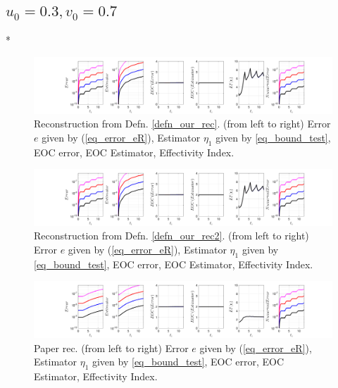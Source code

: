 \documentclass[12pt,a4paper]{article}
\numberwithin{equation}{section}
\theoremstyle{definition}
\begin{document}
\subsection*{$u_0=0.3, v_0= 0.7$}
\/*
\begin{figure}[H]
	\hspace{-3cm}
	\includegraphics[scale=0.55]{fig_LeapFrogplots_1x5_sin_IC_harmonic_order_2_u3_v7_rec_george}	
	\caption{Reconstruction from Defn. \ref{defn_our_rec}. (from left to right) Error $e$ given by (\ref{eq_error_eR}), Estimator $\eta_1$ given by \ref{eq_bound_test},   EOC error, EOC Estimator, Effectivity Index.}
	\label{fig_all_in_one_our_rec_george_u3_v7}
\end{figure}
\begin{figure}[H]
	\hspace{-3cm}
	\includegraphics[scale=0.55]{fig_LeapFrogplots_1x5_sin_IC_harmonic_order_2_u3_v7_rec2}	
	\caption{Reconstruction from Defn. \ref{defn_our_rec2}. (from left to right) Error $e$ given by (\ref{eq_error_eR}), Estimator $\eta_1$ given by \ref{eq_bound_test},  EOC error, EOC Estimator, Effectivity Index.}
	\label{fig_all_in_one_our_rec_2_u3_v7}
\end{figure}
\begin{figure}[H]
	\hspace{-3cm}
	\includegraphics[scale=0.55]{fig_LeapFrogplots_1x5_sin_IC_harmonic_u3_v7_paperrec}	
	\caption{Paper rec. (from left to right) Error $e$ given by (\ref{eq_error_eR}), Estimator $\eta_1$ given by \ref{eq_bound_test}, EOC error, EOC Estimator, Effectivity Index.}
	\label{fig_all_in_one_paperrec_u03_v07}
\end{figure}
\end{document}

